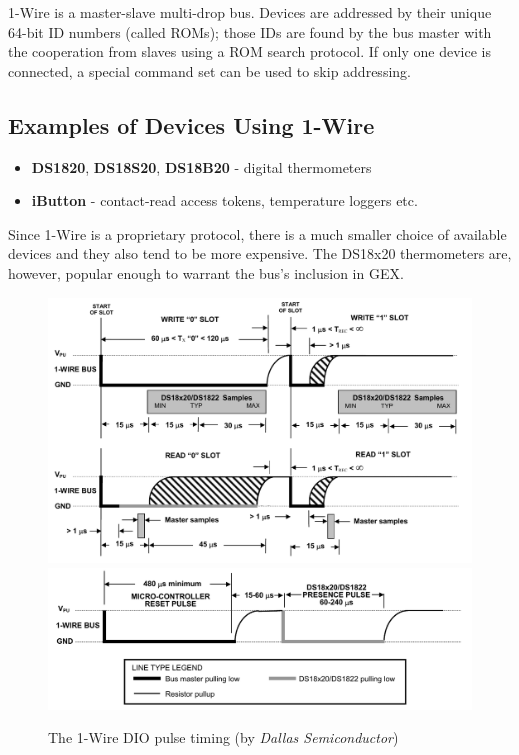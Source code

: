 1-Wire is a master-slave multi-drop bus. Devices are addressed by their unique 64-bit ID numbers (called ROMs); those IDs are found by the bus master with the cooperation from slaves using a ROM search protocol. If only one device is connected, a special command set can be used to skip addressing.

\subsection{Examples of Devices Using 1-Wire}

\begin{itemize}
	\item \textbf{DS1820}, \textbf{DS18S20}, \textbf{DS18B20} - digital thermometers
	\item \textbf{iButton} - contact-read access tokens, temperature loggers etc.
\end{itemize}

Since 1-Wire is a proprietary protocol, there is a much smaller choice of available devices and they also tend to be more expensive. The DS18x20 thermometers are, however, popular enough to warrant the bus's inclusion in GEX.

\begin{figure}
	\centering
	\includegraphics[width=.85\textwidth] {img/1w-rw.png}
	\includegraphics[width=.85\textwidth] {img/1w-reset.png}
	\caption{\label{fig:1w-pulses}The 1-Wire DIO pulse timing (by \textit{Dallas Semiconductor})}
\end{figure}

